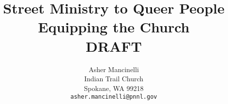 \setlength{\parindent}{4em}
\setlength{\parskip}{1em}
\linespread{1}



\title{Street Ministry to Queer People \\
    \large Equipping the Church \\
    \ifdefined\isedit
    \large DRAFT
    \fi}

\author{Asher Mancinelli \\
    Indian Trail Church \\
    Spokane, WA 99218 \\
    \texttt{asher.mancinelli@pnnl.gov} \\ }
